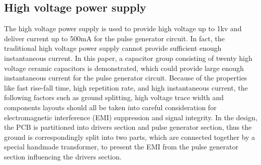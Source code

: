 \documentclass[aip,rsi,reprint,graphicx]{revtex4-1} %
\begin{document}
\subsection{High voltage power supply}
	The high voltage power supply is used to provide high voltage up to 1kv and deliver current up to 500mA for the pulse generator circuit. 
In fact, the traditional high voltage power supply cannot provide sufficient enough instantaneous current. 
In this paper, a capacitor group consisting of twenty high voltage ceramic capacitors is demonstrated, which could provide large enough instantaneous current for the pulse generator circuit.
Because of the properties like fast rise-fall time, high repetition rate, and high instantaneous current, the following factors  such as ground splitting, high voltage trace width and components layouts should all be taken into careful consideration for electromagnetic interference (EMI) suppression and signal integrity.
In the design, the PCB is partitioned into drivers section and pulse generator section, thus the ground is correspondingly split into two parts, which are connected together by a special handmade transformer, to present the EMI from the pulse generator section influencing the drivers section.
\end{document}
